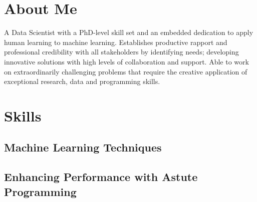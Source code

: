 \documentclass[11pt,a4paper,sans]{moderncv}        %
\begin{document}
\makecvtitle

\section{About Me}

A Data Scientist with a PhD-level skill set and an embedded dedication to apply human learning to machine learning. Establishes productive rapport and professional credibility with all stakeholders by identifying needs; developing innovative solutions with high levels of collaboration and support. Able to work on extraordinarily challenging problems that require the creative application of exceptional research, data and programming skills.


\section{Skills}

\subsection{Machine Learning Techniques}

\subsection{Enhancing Performance with Astute Programming}
\end{document}

